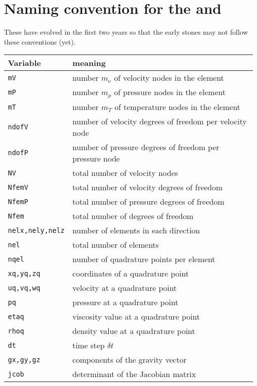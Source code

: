 
\newpage

\newpage %
\section*{
Naming convention for the \stones and \elefant
\label{f000}}

These have evolved in the first two years so that the early stones may not 
follow these conventions (yet).

\begin{tabular}{p{2.5cm}p{14cm}}
\hline
Variable & meaning \\
\hline
\hline
{\tt mV}    & number $m_\upnu$ of velocity nodes in the element \\
{\tt mP}    & number $m_p$ of pressure nodes in the element \\
{\tt mT}    & number $m_T$ of temperature nodes in the element \\
{\tt ndofV} & number of velocity degrees of freedom per velocity node \\
{\tt ndofP} & number of pressure degrees of freedom per pressure node \\
{\tt NV}    & total number of velocity nodes \\
{\tt NfemV} & total number of velocity degrees of freedom \\
{\tt NfemP} & total number of pressure degrees of freedom \\
{\tt Nfem}  & total number of degrees of freedom \\
{\tt nelx,nely,nelz} & number of elements in each direction \\
{\tt nel}   & total number of elements \\
{\tt nqel}  & number of quadrature points per element \\
{\tt xq,yq,zq} & coordinates of a quadrature point \\
{\tt uq,vq,wq} & velocity at a quadrature point \\
{\tt pq}   & pressure at a quadrature point \\
{\tt etaq} & viscosity value at a quadrature point \\
{\tt rhoq} & density value at a quadrature point \\
{\tt dt}   & time step $\delta t$\\ 
{\tt gx,gy,gz} & components of the gravity vector \\
{\tt jcob} & determinant of the Jacobian matrix \\
\hline
\end{tabular}

